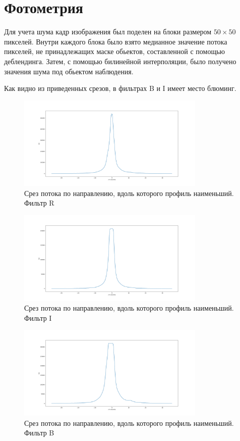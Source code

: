 \documentclass [12pt, a4paper] {article}
\theoremstyle{definition}
\begin{document}
	\section{Фотометрия}
	Для учета шума кадр изображения был поделен на блоки размером $50\times50$ пикселей. Внутри каждого блока было взято медианное значение потока пикселей, не принадлежащих маске обьектов, составленной с помощью деблендинга. Затем, с помощью билинейной интерполяции, было получено значения шума под обьектом наблюдения.
	\par Как видно из приведенных срезов, в фильтрах B и I имеет место блюминг.
\begin{figure}
		\centering
			\includegraphics[width = 0.8\textwidth]{R_slice_min.png}
			\caption{Срез потока по направлению, вдоль которого профиль наименьший. Фильтр R}
		\end{figure}
		\begin{figure}
		\centering
			\includegraphics[width = 0.8\textwidth]{I_slice_min.png}
						\caption{Срез потока по направлению, вдоль которого профиль наименьший. Фильтр I}
		\end{figure}
		\begin{figure}
		\centering
			\includegraphics[width = 0.8\textwidth]{B_slice_min.png}
						\caption{Срез потока по направлению, вдоль которого профиль наименьший. Фильтр B}
					\end{figure}
\end{document}
